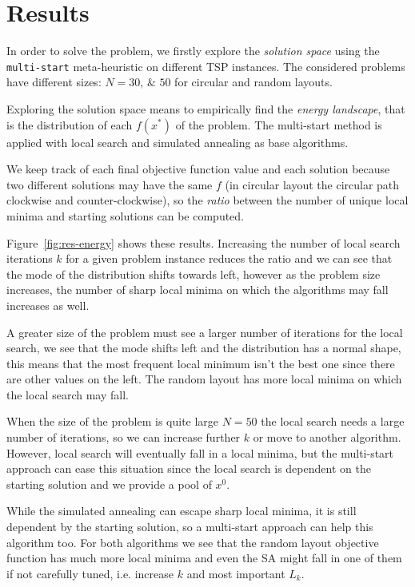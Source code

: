 \section{Results}\label{subsc:res}

In order to solve the problem, we firstly explore the \emph{solution space} using the \texttt{multi-start} meta-heuristic on different TSP instances. The considered problems have different sizes: $N=\numlist{30;50}$ for circular and random layouts.\par\medskip

Exploring the solution space means to empirically find the \emph{energy landscape}, that is the distribution of each $f(x^\ast)$ of the problem. The multi-start method is applied with local search and simulated annealing as base algorithms.

We keep track of each final objective function value and each solution because two different solutions may have the same $f$ (in circular layout the circular path clockwise and counter-clockwise), so the \emph{ratio} between the number of unique local minima and starting solutions can be computed.

Figure~\vref{fig:res-energy} shows these results. Increasing the number of local search iterations $k$ for a given problem instance reduces the ratio and we can see that the mode of the distribution shifts towards left, however as the problem size increases, the number of sharp local minima on which the algorithms may fall increases as well.

A greater size of the problem must see a larger number of iterations for the local search, we see that the mode shifts left and the distribution has a normal shape, this means that the most frequent local minimum isn't the best one since there are other values on the left. The random layout has more local minima on which the local search may fall.

When the size of the problem is quite large $N=50$ the local search needs a large number of iterations, so we can increase further $k$ or move to another algorithm. However, local search will eventually fall in a local minima, but the multi-start approach can ease this situation since the local search is dependent on the starting solution and we provide a pool of $x^0$.

While the simulated annealing can escape sharp local minima, it is still dependent by the starting solution, so a multi-start approach can help this algorithm too. For both algorithms we see that the random layout objective function has much more local minima and even the SA might fall in one of them if not carefully tuned, i.e. increase $k$ and most important $L_k$.\par\medskip

